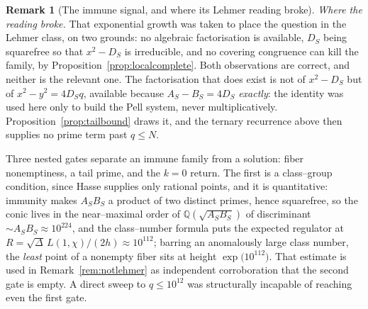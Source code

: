 \documentclass[11pt]{article}
\theoremstyle{definition}
\newtheorem{remark}[theorem]{Remark}
\begin{document}
\begin{remark}[The immune signal, and where its Lehmer reading broke]
\emph{Where the reading broke.} That exponential growth was taken to place the question in the
Lehmer class, on two grounds: no algebraic factorisation is available, $D_S$ being squarefree so
that $x^2-D_S$ is irreducible, and no covering congruence can kill the family, by
Proposition~\ref{prop:localcomplete}. Both observations are correct, and neither is the relevant
one. The factorisation that does exist is not of $x^2-D_S$ but of $x^2-y^2=4D_Sq$, available because
$A_S-B_S=4D_S$ \emph{exactly}: the identity was used here only to build the Pell system, never
multiplicatively. Proposition~\ref{prop:tailbound} draws it, and the ternary recurrence above then
supplies no prime term past $q\le N$.

Three nested gates separate an immune family from a solution: fiber nonemptiness, a tail prime, and
the $k=0$ return. The first is a class--group condition, since Hasse supplies only rational points,
and it is quantitative: immunity makes $A_SB_S$ a product of two distinct primes, hence squarefree,
so the conic lives in the near--maximal order of $\mathbb{Q}(\sqrt{A_SB_S})$ of discriminant
${\sim}A_SB_S\approx10^{224}$, and the class--number formula puts the expected regulator at
$R=\sqrt\Delta\,L(1,\chi)/(2h)\approx10^{112}$; barring an anomalously large class number, the
\emph{least} point of a nonempty fiber sits at height $\exp\bigl(10^{112}\bigr)$. That estimate is
used in Remark~\ref{rem:notlehmer} as independent corroboration that the second gate is empty. A
direct sweep to $q\le10^{12}$ was structurally incapable of reaching even the first gate.
\end{remark}
\end{document}
